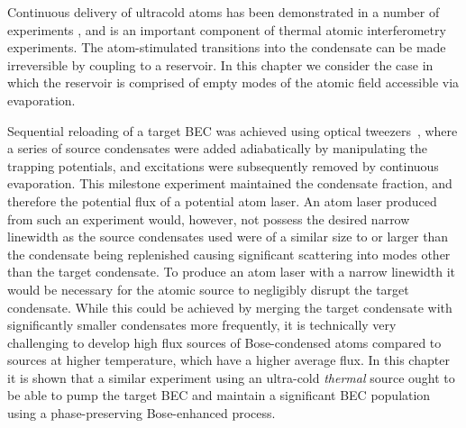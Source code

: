 Continuous delivery of ultracold atoms has been demonstrated in a number of experiments \citep{Schmid:2006,Lahaye:2004,Greiner:2001,Greiner:2007,Streed:2006,Muller:2007}, and is an important component of thermal atomic interferometry experiments.  The atom-stimulated transitions into the condensate can be made irreversible by coupling to a reservoir. In this chapter we consider the case in which the reservoir is comprised of empty modes of the atomic field accessible via evaporation.

Sequential reloading of a target BEC was achieved using optical tweezers~\citep{Chikkatur:2002qa}, where a series of source condensates were added adiabatically by manipulating the trapping potentials, and excitations were subsequently removed by continuous evaporation. This milestone experiment maintained the condensate fraction, and therefore the potential flux of a potential atom laser. An atom laser produced from such an experiment would, however, not possess the desired narrow linewidth as the source condensates used were of a similar size to or larger than the condensate being replenished causing significant scattering into modes other than the target condensate. To produce an atom laser with a narrow linewidth it would be necessary for the atomic source to negligibly disrupt the target condensate.  While this could be achieved by merging the target condensate with significantly smaller condensates more frequently, it is technically very challenging to develop high flux sources of Bose-condensed atoms compared to sources at higher temperature, which have a higher average flux. In this chapter it is shown that a similar experiment using an ultra-cold \emph{thermal} source ought to be able to pump the target BEC and maintain a significant BEC population using a phase-preserving Bose-enhanced process.



